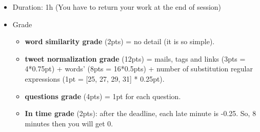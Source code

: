 \documentclass[11pt, a4paper]{article}
\begin{document}
\begin{itemize}
	\item Duration: 1h (You have to return your work at the end of session)
	\item Grade
	\begin{itemize}
		\item \textbf{word similarity grade} (2pts) = no detail (it is so simple).
		\item \textbf{tweet normalization grade} (12pts) = mails, tags and links (3pts = 4*0.75pt) + words'  (8pts = 16*0.5pts) + number of substitution regular expressions (1pt = [25, 27, 29, 31] * 0.25pt).
		\item \textbf{questions grade} (4pts) = 1pt for each question.
		\item \textbf{In time grade} (2pts): after the deadline, each late minute is -0.25. So, 8 minutes then you will get 0.
	\end{itemize}
\end{itemize}
\end{document}

